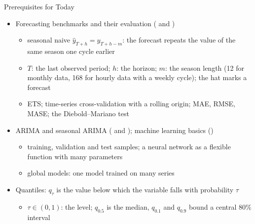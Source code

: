 \begin{frame}{Prerequisites for Today}
\itemsize{\footnotesize}
\begin{itemize}
    \item Forecasting benchmarks and their evaluation ( and )
    \begin{itemize}
        \item seasonal naive $\hat y_{T+h} = y_{T+h-m}$: the forecast repeats the value of the same season one cycle earlier
        \item $T$: the last observed period; $h$: the horizon; $m$: the season length (12 for monthly data, 168 for hourly data with a weekly cycle); the hat marks a forecast
        \item ETS; time-series cross-validation with a rolling origin; MAE, RMSE, MASE; the Diebold--Mariano test
    \end{itemize}
    \item ARIMA and seasonal ARIMA ( and ); machine learning basics ()
    \begin{itemize}
        \item training, validation and test samples; a neural network as a flexible function with many parameters
        \item global models: one model trained on many series
    \end{itemize}
    \item Quantiles: $q_\tau$ is the value below which the variable falls with probability $\tau$
    \begin{itemize}
        \item $\tau \in (0, 1)$: the level; $q_{0.5}$ is the median, $q_{0.1}$ and $q_{0.9}$ bound a central 80\% interval
    \end{itemize}
\end{itemize}
\end{frame}


